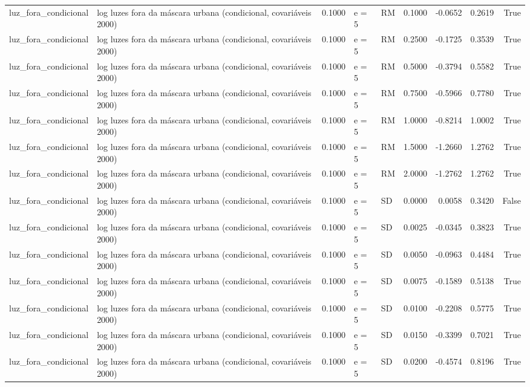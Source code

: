 \begin{table}
{\begin{tabular}{llrllrrrr}
luz\_fora\_condicional & log luzes fora da máscara urbana (condicional, covariáveis 2000) & 0.1000 & e = 5 & RM & 0.1000 & -0.0652 & 0.2619 & True \\
luz\_fora\_condicional & log luzes fora da máscara urbana (condicional, covariáveis 2000) & 0.1000 & e = 5 & RM & 0.2500 & -0.1725 & 0.3539 & True \\
luz\_fora\_condicional & log luzes fora da máscara urbana (condicional, covariáveis 2000) & 0.1000 & e = 5 & RM & 0.5000 & -0.3794 & 0.5582 & True \\
luz\_fora\_condicional & log luzes fora da máscara urbana (condicional, covariáveis 2000) & 0.1000 & e = 5 & RM & 0.7500 & -0.5966 & 0.7780 & True \\
luz\_fora\_condicional & log luzes fora da máscara urbana (condicional, covariáveis 2000) & 0.1000 & e = 5 & RM & 1.0000 & -0.8214 & 1.0002 & True \\
luz\_fora\_condicional & log luzes fora da máscara urbana (condicional, covariáveis 2000) & 0.1000 & e = 5 & RM & 1.5000 & -1.2660 & 1.2762 & True \\
luz\_fora\_condicional & log luzes fora da máscara urbana (condicional, covariáveis 2000) & 0.1000 & e = 5 & RM & 2.0000 & -1.2762 & 1.2762 & True \\
luz\_fora\_condicional & log luzes fora da máscara urbana (condicional, covariáveis 2000) & 0.1000 & e = 5 & SD & 0.0000 & 0.0058 & 0.3420 & False \\
luz\_fora\_condicional & log luzes fora da máscara urbana (condicional, covariáveis 2000) & 0.1000 & e = 5 & SD & 0.0025 & -0.0345 & 0.3823 & True \\
luz\_fora\_condicional & log luzes fora da máscara urbana (condicional, covariáveis 2000) & 0.1000 & e = 5 & SD & 0.0050 & -0.0963 & 0.4484 & True \\
luz\_fora\_condicional & log luzes fora da máscara urbana (condicional, covariáveis 2000) & 0.1000 & e = 5 & SD & 0.0075 & -0.1589 & 0.5138 & True \\
luz\_fora\_condicional & log luzes fora da máscara urbana (condicional, covariáveis 2000) & 0.1000 & e = 5 & SD & 0.0100 & -0.2208 & 0.5775 & True \\
luz\_fora\_condicional & log luzes fora da máscara urbana (condicional, covariáveis 2000) & 0.1000 & e = 5 & SD & 0.0150 & -0.3399 & 0.7021 & True \\
luz\_fora\_condicional & log luzes fora da máscara urbana (condicional, covariáveis 2000) & 0.1000 & e = 5 & SD & 0.0200 & -0.4574 & 0.8196 & True \\

\end{tabular}}
\end{table}
